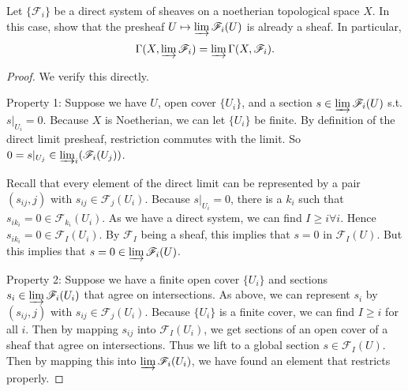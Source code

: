\begin{exercise}[1.11]
	Let $\{\mathscr{F}_i\}   $ be a direct system of sheaves on a noetherian topological space $X $. In this case, show that the presheaf $U\mapsto \varinjlim \mathscr{F}_i(U)$ is already a sheaf. In particular,
	\[
		\Gamma(X, \varinjlim \mathscr{F}_i) = \varinjlim \Gamma(X,\mathscr{F}_i)
	.\]
\end{exercise}
\begin{proof}
	We verify this directly.

	Property 1: Suppose we have $U $, open cover $\{U_i\}$, and a section $s \in \varinjlim \mathscr{F}_i(U) $ s.t. $s|_{U_i} = 0 $.
	Because $X $ is Noetherian, we can let $\{U_i\}   $ be finite.
	By definition of the direct limit presheaf, restriction commutes with the limit.
	So $0 = s|_{U_j} \in \varinjlim_i (\mathscr{F}_i(U_j))$.

	Recall that every element of the direct limit can be represented by a pair $(s_{ij}, j) $ with $s_{ij} \in \mathscr{F}_j(U_i) $.
	Because $s|_{U_i} = 0 $, there is a $k_i $ such that $s_{ik_i} = 0 \in \mathscr{F}_{k_i}(U_i) $.
	As we have a direct system, we can find $I \ge i \forall i $.
	Hence $s_{ik_i} = 0 \in \mathscr{F}_I(U_i) $.
	By $\mathscr{F}_I $ being a sheaf, this implies that $s = 0 $ in $\mathscr{F}_I(U) $.
	But this implies that $s = 0 \in \varinjlim \mathscr{F}_i(U) $.

	Property 2: Suppose we have a finite open cover $\{U_i\}$ and sections $s_i \in \varinjlim \mathscr{F}_i(U_i)$ that agree on intersections.
	As above, we can represent $s_i $ by $(s_{ij},j) $ with $s_{ij} \in \mathscr{F}_j(U_i) $.
	Because $\{U_i\}   $ is a finite cover, we can find $I \ge i $ for all $i $.
	Then by mapping $s_{ij} $ into $\mathscr{F}_I(U_i) $, we get sections of an open cover of a sheaf that agree on intersections.
	Thus we lift to a global section $s \in \mathscr{F}_I(U)$.
	Then by mapping this into $\varinjlim \mathscr{F}_i(U_i) $, we have found an element that restricts properly.
\end{proof}

